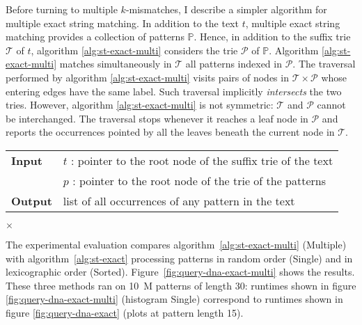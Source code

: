 Before turning to multiple $k$-mismatches, I describe a simpler algorithm for multiple exact string matching.
In addition to the text $t$, multiple exact string matching provides a collection of patterns $\mathbb{P}$.
Hence, in addition to the suffix trie $\mathcal{T}$ of $t$, algorithm \ref{alg:st-exact-multi} considers the trie $\mathcal{P}$ of $\mathbb{P}$.
Algorithm \ref{alg:st-exact-multi} matches simultaneously in $\mathcal{T}$ all patterns indexed in $\mathcal{P}$.
The traversal performed by algorithm \ref{alg:st-exact-multi} visits pairs of nodes in $\mathcal{T} \times \mathcal{P}$ whose entering edges have the same label.
Such traversal implicitly \emph{intersects} the two tries.
However, algorithm \ref{alg:st-exact-multi} is not symmetric: $\mathcal{T}$ and $\mathcal{P}$ cannot be interchanged.
The traversal stops whenever it reaches a leaf node in $\mathcal{P}$ and reports the occurrences pointed by all the leaves beneath the current node in $\mathcal{T}$.

\begin{figure*}[t]
\begin{center}
\begin{minipage}[t]{.8\textwidth}
\begin{algorithm}[H]
\begin{tabular}{ll}
\textbf{Input}  & $t$ : pointer to the root node of the suffix trie of the text\\
 			    & $p$ : pointer to the root node of the trie of the patterns\\
\textbf{Output} & list of all occurrences of any pattern in the text\\
\end{tabular}
\begin{algorithmic}[1]
	\State \Report {} $\times$ 
\Else
	\State {}
	\Repeat
			\State {}
			\State {}
		\EndIf
\EndIf
\end{algorithmic}
\label{alg:st-exact-multi}
\end{algorithm}
\end{minipage}
\end{center}
\end{figure*}

The experimental evaluation compares algorithm~\ref{alg:st-exact-multi} (Multiple) with algorithm~\ref{alg:st-exact} processing patterns in random order (Single) and in lexicographic order (Sorted).
Figure~\ref{fig:query-dna-exact-multi} shows the results.
These three methods ran on 10~M patterns of length 30: runtimes shown in figure \ref{fig:query-dna-exact-multi} (histogram Single) correspond to runtimes shown in figure \ref{fig:query-dna-exact} (plots at pattern length 15).

